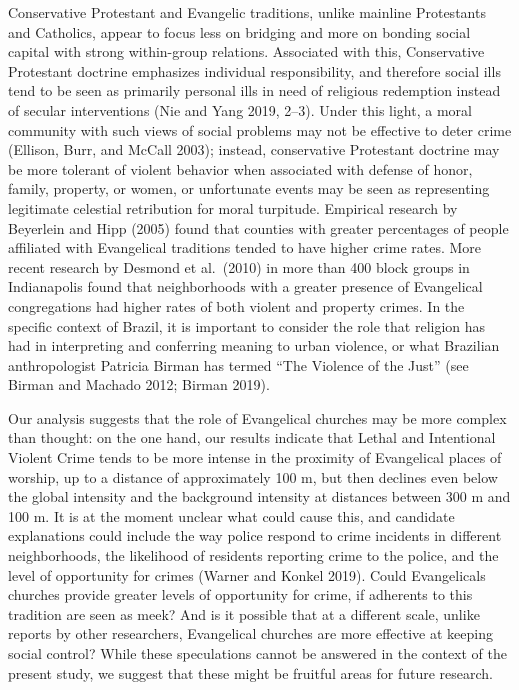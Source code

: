 \documentclass[smallextended]{svjour3}       %
\begin{document}
Conservative Protestant and Evangelic traditions, unlike mainline
Protestants and Catholics, appear to focus less on bridging and more on
bonding social capital with strong within-group relations. Associated
with this, Conservative Protestant doctrine emphasizes individual
responsibility, and therefore social ills tend to be seen as primarily
personal ills in need of religious redemption instead of secular
interventions (Nie and Yang 2019, 2--3). Under this light, a moral
community with such views of social problems may not be effective to
deter crime (Ellison, Burr, and McCall 2003); instead, conservative
Protestant doctrine may be more tolerant of violent behavior when
associated with defense of honor, family, property, or women, or
unfortunate events may be seen as representing legitimate celestial
retribution for moral turpitude. Empirical research by Beyerlein and
Hipp (2005) found that counties with greater percentages of people
affiliated with Evangelical traditions tended to have higher crime
rates. More recent research by Desmond et al.~(2010) in more than 400
block groups in Indianapolis found that neighborhoods with a greater
presence of Evangelical congregations had higher rates of both violent
and property crimes. In the specific context of Brazil, it is important
to consider the role that religion has had in interpreting and
conferring meaning to urban violence, or what Brazilian anthropologist
Patricia Birman has termed ``The Violence of the Just'' (see Birman and
Machado 2012; Birman 2019).

Our analysis suggests that the role of Evangelical churches may be more
complex than thought: on the one hand, our results indicate that Lethal
and Intentional Violent Crime tends to be more intense in the proximity
of Evangelical places of worship, up to a distance of approximately 100
m, but then declines even below the global intensity and the background
intensity at distances between 300 m and 100 m. It is at the moment
unclear what could cause this, and candidate explanations could include
the way police respond to crime incidents in different neighborhoods,
the likelihood of residents reporting crime to the police, and the level
of opportunity for crimes (Warner and Konkel 2019). Could Evangelicals
churches provide greater levels of opportunity for crime, if adherents
to this tradition are seen as meek? And is it possible that at a
different scale, unlike reports by other researchers, Evangelical
churches are more effective at keeping social control? While these
speculations cannot be answered in the context of the present study, we
suggest that these might be fruitful areas for future research.
\end{document}
